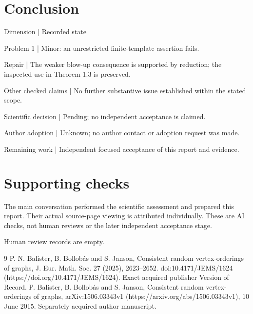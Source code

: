 \documentclass[10pt]{article}
\begin{document}
\section*{Conclusion}
Dimension | Recorded state\par
Problem 1 | Minor: an unrestricted finite-template assertion fails.\par
Repair | The weaker blow-up consequence is supported by reduction; the inspected use in Theorem 1.3 is preserved.\par
Other checked claims | No further substantive issue established within the stated scope.\par
Scientific decision | Pending; no independent acceptance is claimed.\par
Author adoption | Unknown; no author contact or adoption request was made.\par
Remaining work | Independent focused acceptance of this report and evidence.\par
\section*{Supporting checks}
The main conversation performed the scientific assessment and prepared this report. Their actual source-page viewing is attributed individually. These are AI checks, not human reviews or the later independent acceptance stage.\par
Human review records are empty.\par
9 P. N. Balister, B. Bollobás and S. Janson, Consistent random vertex-orderings of graphs, J. Eur. Math. Soc. 27 (2025), 2623–2652. doi:10.4171/JEMS/1624 (https://doi.org/10.4171/JEMS/1624). Exact acquired publisher Version of Record. P. Balister, B. Bollobás and S. Janson, Consistent random vertex-orderings of graphs, arXiv:1506.03343v1 (https://arxiv.org/abs/1506.03343v1), 10 June 2015. Separately acquired author manuscript.\par
\end{document}
